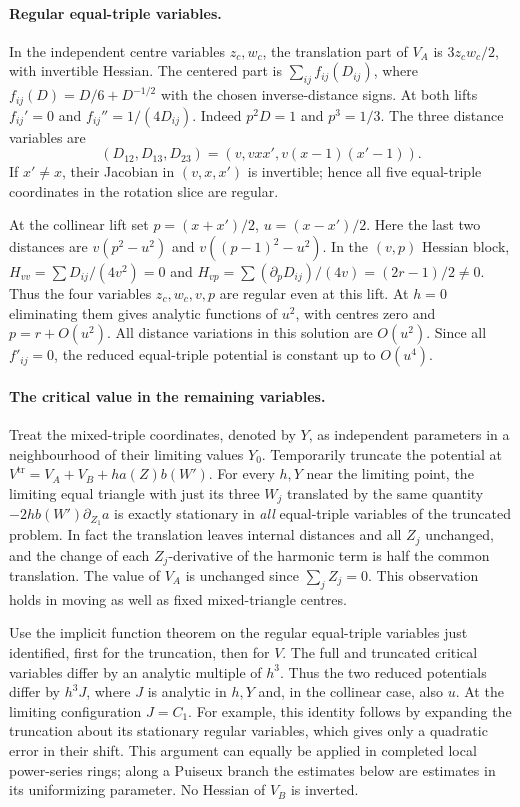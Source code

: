 \documentclass[11pt]{article}
\begin{document}
\paragraph{Regular equal-triple variables.}
In the independent centre variables \(z_c,w_c\), the translation part
of \(V_A\) is \(3z_cw_c/2\), with invertible Hessian. The centered
part is \(\sum_{ij} f_{ij}(D_{ij})\), where
\(f_{ij}(D)=D/6+D^{-1/2}\) with the chosen inverse-distance signs.
At both lifts \(f_{ij}'=0\) and \(f_{ij}''=1/(4D_{ij})\).
Indeed \(p^2D=1\) and \(p^3=1/3\).
The three distance variables are
\[
  (D_{12},D_{13},D_{23})=(v,vxx',v(x-1)(x'-1)).
\]
If \(x'\ne x\), their Jacobian in \((v,x,x')\) is invertible; hence
all five equal-triple coordinates in the rotation slice are regular.

At the collinear lift set \(p=(x+x')/2\), \(u=(x-x')/2\).
Here the last two distances are \(v(p^2-u^2)\) and
\(v((p-1)^2-u^2)\). In the \((v,p)\) Hessian block,
\(H_{vv}=\sum D_{ij}/(4v^2)=0\) and
\(H_{vp}=\sum(\partial_pD_{ij})/(4v)=(2r-1)/2\ne0\).
Thus the four variables \(z_c,w_c,v,p\) are regular even at this lift.
At \(h=0\) eliminating them gives analytic functions of \(u^2\), with
centres zero and \(p=r+O(u^2)\). All distance variations in this
solution are \(O(u^2)\). Since all \(f'_{ij}=0\), the reduced
equal-triple potential is constant up to \(O(u^4)\).

\paragraph{The critical value in the remaining variables.}
Treat the mixed-triple coordinates, denoted by \(Y\), as independent
parameters in a neighbourhood of their limiting values \(Y_0\).
Temporarily truncate the potential at
\(V^{\mathrm{tr}}=V_A+V_B+h a(Z)b(W')\). For every \(h,Y\) near
the limiting point, the limiting equal triangle with just its three
\(W_j\) translated by the same quantity
\(-2h b(W')\partial_{Z_1}a\) is exactly stationary in \emph{all}
equal-triple variables of the truncated problem. In fact the
translation leaves internal distances and all \(Z_j\) unchanged,
and the change of each \(Z_j\)-derivative of the harmonic term is half
the common translation. The value of \(V_A\) is unchanged since
\(\sum_j Z_j=0\). This observation holds in moving as well as fixed
mixed-triangle centres.

Use the implicit function theorem on the regular equal-triple variables
just identified, first for the truncation, then for \(V\). The full and
truncated critical variables differ by an analytic multiple of \(h^3\).
Thus the two reduced potentials differ by \(h^3 J\), where \(J\)
is analytic in \(h,Y\) and, in the collinear case, also \(u\).
At the limiting configuration \(J=C_1\). For example, this identity
follows by expanding the truncation about its stationary regular
variables, which gives only a quadratic error in their shift. This
argument can equally be applied in completed local power-series rings;
along a Puiseux branch the estimates below are estimates in its
uniformizing parameter. No Hessian of \(V_B\) is inverted.
\end{document}
